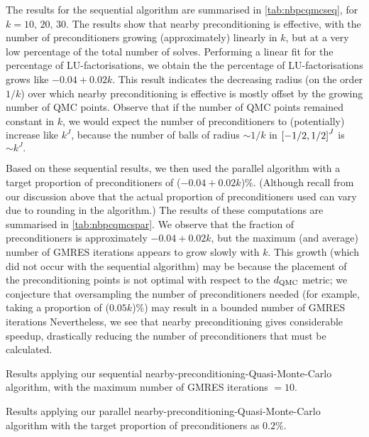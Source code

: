     The results for the sequential algorithm are summarised in \cref{tab:nbpcqmcseq}, for $k = 10,\,20,\,30$. The results show that nearby preconditioning is effective, with the number of preconditioners growing (approximately) linearly in $k$, but at a very low percentage of the total number of solves. Performing a linear fit for the percentage of LU-factorisations, we obtain the the percentage of LU-factorisations grows like $-0.04 + 0.02k$. This result indicates the decreasing radius (on the order $1/k$) over which nearby preconditioning is effective is mostly offset by the growing number of QMC points. Observe that if the number of QMC points remained constant in $k$, we would expect the number of preconditioners to (potentially) increase like $k^J$, because the number of balls of radius $\sim 1/k$ in $\cube{J}$ is $\sim k^J.$

    Based on these sequential results, we then used the parallel algorithm with a target proportion of preconditioners of ($-0.04 + 0.02k$)\%. (Although recall from our discussion above that the actual proportion of preconditioners used can vary due to rounding in the algorithm.) The results of these computations are summarised in \cref{tab:nbpcqmcspar}. We observe that the fraction of preconditioners is approximately $-0.04 + 0.02k$, but the maximum (and average) number of GMRES iterations appears to grow slowly with $k.$ This growth (which did not occur with the sequential algorithm) may be because the placement of the preconditioning points is not optimal with respect to the $d_{\mathrm{QMC}}$ metric; we conjecture that oversampling the number of preconditioners needed (for example, taking a proportion of ($0.05k$)\%) may result in a bounded number of GMRES iterations Nevertheless, we see that nearby preconditioning gives considerable speedup, drastically reducing the number of preconditioners that must be calculated.

    \begin{table}
  \centering
  
  \caption{Results applying our sequential nearby-preconditioning-Quasi-Monte-Carlo algorithm, with the maximum number of GMRES iterations $=10$.}\label{tab:nbpcqmcseq}
\end{table}

\begin{table}
  \centering
  
  \caption{Results applying our parallel nearby-preconditioning-Quasi-Monte-Carlo algorithm with the target proportion of preconditioners as $0.2$\%.}\label{tab:nbpcqmcspar}
  \end{table}

